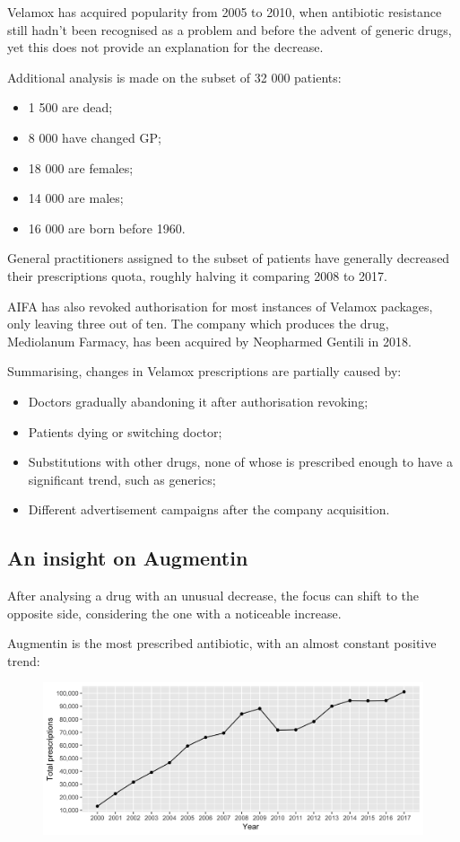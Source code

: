 Velamox has acquired popularity from 2005 to 2010, when antibiotic resistance still hadn't been recognised as a problem and before the advent of generic drugs, yet this does not provide an explanation for the decrease.

Additional analysis is made on the subset of 32 000 patients:
\begin{itemize}
	\item 1 500 are dead;
	\item 8 000 have changed GP;
	\item 18 000 are females;
	\item 14 000 are males;
	\item 16 000 are born before 1960.
\end{itemize}

General practitioners assigned to the subset of patients have generally decreased their prescriptions quota, roughly halving it comparing 2008 to 2017.

AIFA has also revoked authorisation for most instances of Velamox packages, only leaving three out of ten. The company which produces the drug, Mediolanum Farmacy, has been acquired by Neopharmed Gentili in 2018.

Summarising, changes in Velamox prescriptions are partially caused by:
\begin{itemize}
	\item Doctors gradually abandoning it after authorisation revoking;
	\item Patients dying or switching doctor;
	\item Substitutions with other drugs, none of whose is prescribed enough to have a significant trend, such as generics;
	\item Different advertisement campaigns after the company acquisition.
\end{itemize}

\subsection{An insight on Augmentin}
After analysing a drug with an unusual decrease, the focus can shift to the opposite side, considering the one with a noticeable increase.

Augmentin is the most prescribed antibiotic, with an almost constant positive trend:

\begin{figure}[h]
	\centering
	\includegraphics[scale=0.3]{../plots/augmentin-year.png}
\end{figure}

